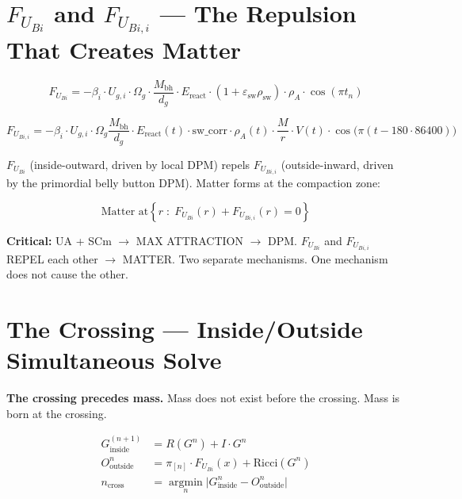 \documentclass[12pt,a4paper]{article}
\begin{document}
\section{\texorpdfstring{$F_{U_{Bi}}$}{FUBi} and \texorpdfstring{$F_{U_{Bi,i}}$}{FUBii} --- The Repulsion That Creates Matter}
\label{sec:fubi}

\begin{equation}
  F_{U_{Bi}} = -\beta_i \cdot U_{g,i} \cdot \Omega_g \cdot \frac{M_{\text{bh}}}{d_g}
    \cdot E_{\text{react}} \cdot (1+\varepsilon_{\text{sw}}\rho_{\text{sw}})
    \cdot \rho_A \cdot \cos(\pi t_n)
  \label{eq:fubi}
\end{equation}

\begin{equation}
  F_{U_{Bi,i}} = -\beta_i \cdot U_{g,i} \cdot \Omega_g \frac{M_{\text{bh}}}{d_g}
    \cdot E_{\text{react}}(t) \cdot \text{sw\_corr}
    \cdot \rho_A(t) \cdot \frac{M}{r} \cdot V(t) \cdot \cos\!\bigl(\pi(t-180\cdot86400)\bigr)
  \label{eq:fubii}
\end{equation}

$F_{U_{Bi}}$ (inside-outward, driven by local DPM) repels $F_{U_{Bi,i}}$
(outside-inward, driven by the primordial belly button DPM).
Matter forms at the compaction zone:

\begin{equation}
  \text{Matter at} \left\{r \;:\; F_{U_{Bi}}(r) + F_{U_{Bi,i}}(r) = 0\right\}
  \label{eq:matter_zone}
\end{equation}

\textbf{Critical:} UA + SCm $\to$ MAX ATTRACTION $\to$ DPM.
$F_{U_{Bi}}$ and $F_{U_{Bi,i}}$ REPEL each other $\to$ MATTER.
Two separate mechanisms.  One mechanism does not cause the other.

\section{The Crossing --- Inside/Outside Simultaneous Solve}
\label{sec:crossing}

\textbf{The crossing precedes mass.}
Mass does not exist before the crossing.  Mass is born at the crossing.

\begin{align}
  G^{(n+1)}_{\text{inside}} &= R(G^n) + I \cdot G^n \label{eq:inside}\\
  O^n_{\text{outside}} &= \pi_{[n]} \cdot F_{U_{Bi}}(x) + \text{Ricci}(G^n) \label{eq:outside}\\
  n_{\text{cross}} &= \operatorname*{argmin}_n \bigl|G^n_{\text{inside}}
    - O^n_{\text{outside}}\bigr| \label{eq:ncross}
\end{align}
\end{document}

